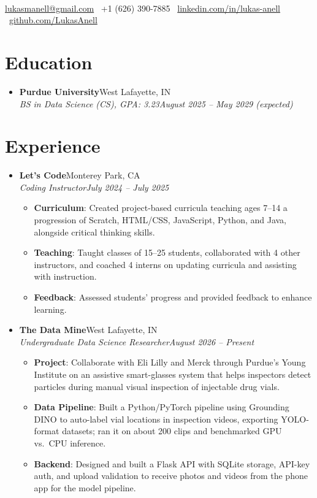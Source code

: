 \documentclass[letterpaper,11pt]{article}
\newcommand{\resumeItem}[2]{
	\item\small{
		\textbf{#1}{: #2}
	}
}
\newcommand{\resumeSubheading}[4]{
	\item
	\textbf{#1}\hfill #2\\
	\textit{\small #3}\hfill \textit{\small #4}
}
\newcommand{\resumeSubHeadingListStart}{\begin{itemize}[leftmargin=*, itemsep=4pt, topsep=2pt, parsep=0pt]}
\newcommand{\resumeSubHeadingListEnd}{\end{itemize}}
\newcommand{\resumeItemListStart}{\begin{itemize}[itemsep=1pt, parsep=0pt, topsep=2pt]}
\newcommand{\resumeItemListEnd}{\end{itemize}}
\begin{document}
\\
{\small \href{mailto:lukasmanell@gmail.com}{lukasmanell@gmail.com} \textbar\ +1 (626) 390-7885 \textbar\ \href{https://www.linkedin.com/in/lukas-anell/}{linkedin.com/in/lukas-anell} \textbar\ \href{https://github.com/LukasAnell}{github.com/LukasAnell}}


\section{Education}
\resumeSubHeadingListStart
\resumeSubheading
{Purdue University}{West Lafayette, IN}
{BS in Data Science (CS), GPA: 3.23}{August 2025 -- May 2029 (expected)}
\resumeSubHeadingListEnd


\section{Experience}
\resumeSubHeadingListStart

\resumeSubheading
{Let's Code}{Monterey Park, CA}
{Coding Instructor}{July 2024 -- July 2025}
\resumeItemListStart
\resumeItem{Curriculum}
{Created project-based curricula teaching ages 7--14 a progression of Scratch, HTML/CSS, JavaScript, Python, and Java, alongside critical thinking skills.}
\resumeItem{Teaching}
{Taught classes of 15--25 students, collaborated with 4 other instructors, and coached 4 interns on updating curricula and assisting with instruction.}
\resumeItem{Feedback}
{Assessed students' progress and provided feedback to enhance learning.}
\resumeItemListEnd

\resumeSubheading
{The Data Mine}{West Lafayette, IN}
{Undergraduate Data Science Researcher}{August 2026 -- Present}
\resumeItemListStart
\resumeItem{Project}
{Collaborate with Eli Lilly and Merck through Purdue's Young Institute on an assistive smart-glasses system that helps inspectors detect particles during manual visual inspection of injectable drug vials.}
\resumeItem{Data Pipeline}
{Built a Python/PyTorch pipeline using Grounding DINO to auto-label vial locations in inspection videos, exporting YOLO-format datasets; ran it on about 200 clips and benchmarked GPU vs.\ CPU inference.}
\resumeItem{Backend}
{Designed and built a Flask API with SQLite storage, API-key auth, and upload validation to receive photos and videos from the phone app for the model pipeline.}
\resumeItemListEnd
\resumeSubHeadingListEnd
\end{document}
